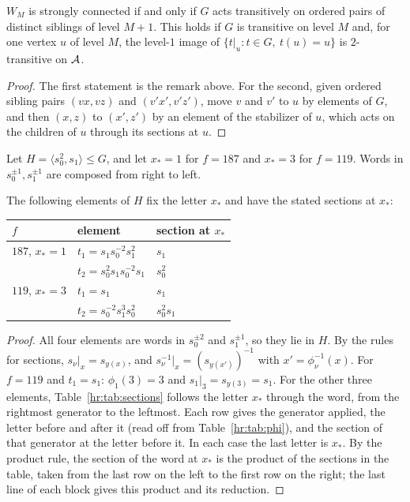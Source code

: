 \begin{lemma}\label{hr:lem:Wtree}
$W_M$ is strongly connected if and only if $G$ acts transitively on ordered pairs of distinct siblings of level $M+1$. This holds if $G$ is transitive on level $M$ and, for one vertex $u$ of level $M$, the level-$1$ image of $\{t|_u:t\in G,\ t(u)=u\}$ is $2$-transitive on $\mathcal{A}$.
\end{lemma}

\begin{proof}
The first statement is the remark above. For the second, given ordered sibling pairs $(vx,vz)$ and $(v'x',v'z')$, move $v$ and $v'$ to $u$ by elements of $G$, and then $(x,z)$ to $(x',z')$ by an element of the stabilizer of $u$, which acts on the children of $u$ through its sections at $u$.
\end{proof}

Let $H=\langle s_0^2,s_1\rangle\le G$, and let $x_*=1$ for $f=187$ and $x_*=3$ for $f=119$. Words in $s_0^{\pm1},s_1^{\pm1}$ are composed from right to left.

\begin{lemma}\label{hr:lem:sections}
The following elements of $H$ fix the letter $x_*$ and have the stated sections at $x_*$:
\begin{center}
\begin{tabular}{lll}
\toprule
$f$ & element & section at $x_*$\\
\midrule
$187$, $x_*=1$ & $t_1=s_1s_0^{-2}s_1^2$ & $s_1$\\
& $t_2=s_0^2s_1s_0^{-2}s_1$ & $s_0^2$\\
\midrule
$119$, $x_*=3$ & $t_1=s_1$ & $s_1$\\
& $t_2=s_0^{-2}s_1^3s_0^2$ & $s_0^2s_1$\\
\bottomrule
\end{tabular}
\end{center}
\end{lemma}

\begin{proof}
All four elements are words in $s_0^{\pm2}$ and $s_1^{\pm1}$, so they lie in $H$. By the rules for sections, $s_\nu|_x=s_{y(x)}$, and $s_\nu^{-1}|_x=(s_{y(x')})^{-1}$ with $x'=\phi_\nu^{-1}(x)$. For $f=119$ and $t_1=s_1$: $\phi_1(3)=3$ and $s_1|_3=s_{y(3)}=s_1$. For the other three elements, Table~\ref{hr:tab:sections} follows the letter $x_*$ through the word, from the rightmost generator to the leftmost. Each row gives the generator applied, the letter before and after it (read off from Table~\ref{hr:tab:phi}), and the section of that generator at the letter before it. In each case the last letter is $x_*$. By the product rule, the section of the word at $x_*$ is the product of the sections in the table, taken from the last row on the left to the first row on the right; the last line of each block gives this product and its reduction.
\end{proof}

